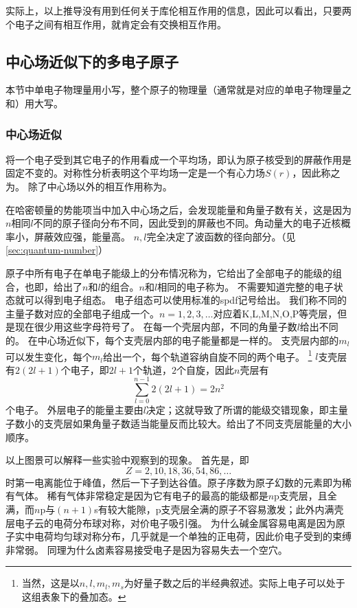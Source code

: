 实际上，以上推导没有用到任何关于库伦相互作用的信息，因此可以看出，只要两个电子之间有相互作用，就肯定会有交换相互作用。

\subsection{中心场近似下的多电子原子}

本节中单电子物理量用小写，整个原子的物理量（通常就是对应的单电子物理量之和）用大写。

\subsubsection{中心场近似}\label{sec:centric-field}

将一个电子受到其它电子的作用看成一个平均场，即认为原子核受到的屏蔽作用是固定不变的。对称性分析表明这个平均场一定是一个有心力场$S(r)$，因此称之为。
除了中心场以外的相互作用称为。

在哈密顿量的势能项当中加入中心场之后，会发现能量和角量子数有关，这是因为$n$相同$l$不同的原子径向分布不同，因此受到的屏蔽也不同。角动量大的电子近核概率小，屏蔽效应强，能量高。
$n, l$完全决定了波函数的径向部分。（见\autoref{sec:quantum-number}）

原子中所有电子在单电子能级上的分布情况称为，它给出了全部电子的能级的组合，也即，给出了$n$和$l$的组合。$n$和$l$相同的电子称为。
不需要知道完整的电子状态就可以得到电子组态。
电子组态可以使用标准的spdf记号给出。
我们称不同的主量子数对应的全部电子组成一个。$n=1, 2, 3, \ldots$对应着K,L,M,N,O,P等壳层，但是现在很少用这些字母符号了。
在每一个壳层内部，不同的角量子数$l$给出不同的。
在中心场近似下，每个支壳层内部的电子能量都是一样的。
支壳层内部的$m_l$可以发生变化，每个$m_l$给出一个，每个轨道容纳自旋不同的两个电子。%
\footnote{当然，这是以$n,l,m_l,m_s$为好量子数之后的半经典叙述。实际上电子可以处于这组表象下的叠加态。}%
$l$支壳层有$2(2l+1)$个电子，即$2l+1$个轨道，$2$个自旋，因此$n$壳层有
\[
    \sum_{l=0}^{n-1} 2(2l+1) = 2n^2
\]
个电子。
外层电子的能量主要由$l$决定；这就导致了所谓的能级交错现象，即主量子数小的支壳层如果角量子数适当能量反而比较大。给出了不同支壳层能量的大小顺序。

以上图景可以解释一些实验中观察到的现象。
首先是，即
\[
    Z=2, 10, 18, 36, 54, 86, \ldots
\]
时第一电离能位于峰值，然后一下子到达谷值。原子序数为原子幻数的元素即为稀有气体。
稀有气体非常稳定是因为它有电子的最高的能级都是$n$p支壳层，且全满，而$n$p与$(n+1)$s有较大能隙，p支壳层全满的原子不容易激发；此外内满壳层电子云的电荷分布球对称，对价电子吸引强。
为什么碱金属容易电离是因为原子实中电荷均匀球对称分布，几乎就是一个单独的正电荷，因此价电子受到的束缚非常弱。
同理为什么卤素容易接受电子是因为容易失去一个空穴。

